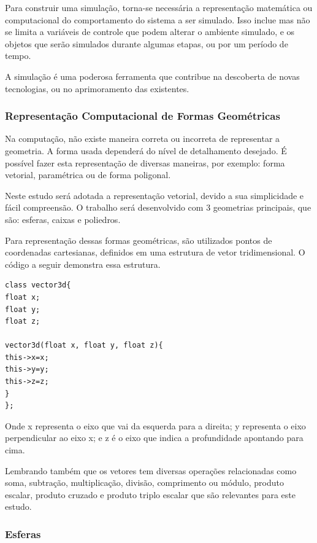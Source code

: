 Para construir uma simulação, torna-se necessária a representação matemática ou
computacional do comportamento do sistema a ser simulado. Isso inclue mas não
se limita a variáveis de controle que podem alterar o ambiente simulado, e os
objetos que serão simulados durante algumas etapas, ou por um período de tempo.

A simulação é uma poderosa ferramenta que contribue na descoberta de novas
tecnologias, ou no aprimoramento das existentes.


\subsubsection{Representação Computacional de Formas Geométricas}
Na computação, não existe maneira correta ou incorreta de representar a
geometria. A forma usada dependerá  do nível de detalhamento desejado. É possível fazer esta representação de diversas maneiras, por exemplo: forma vetorial, paramétrica ou de forma poligonal.

Neste estudo será adotada a representação vetorial, devido a sua simplicidade e fácil compreensão. O trabalho será desenvolvido com 3 geometrias principais, que são: esferas, caixas e poliedros.

Para representação dessas formas geométricas, são utilizados pontos de coordenadas cartesianas, definidos em uma estrutura de vetor tridimensional. O código a seguir demonstra essa estrutura.

\begin{lstlisting}[frame=single,caption=Exemplo de vetor 3d\label{code:vec3d_1}]
class vector3d{
float x;
float y;
float z;

vector3d(float x, float y, float z){
this->x=x;
this->y=y;
this->z=z;
}
};
\end{lstlisting}

Onde x representa o eixo que vai da esquerda para a direita;
y representa o eixo  perpendicular ao eixo x;
e z é o eixo que indica a profundidade apontando para cima.


Lembrando também que os vetores tem diversas operações relacionadas como soma,
subtração, multiplicação, divisão, comprimento ou módulo, produto escalar,
produto cruzado e produto triplo escalar que são relevantes para este estudo.

\subsubsection{Esferas}

